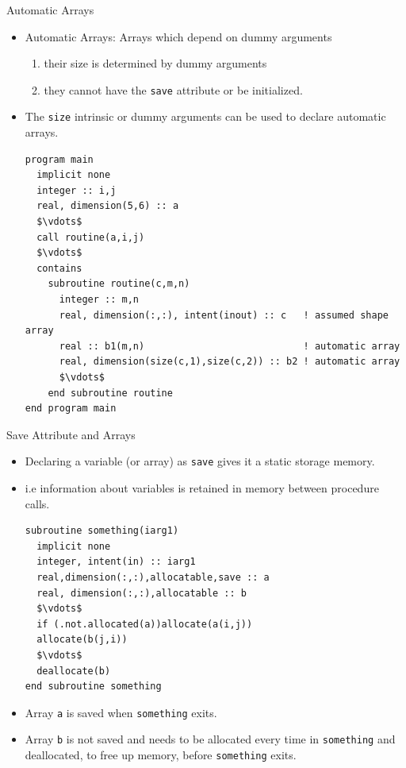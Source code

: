 \documentclass[c,mathserif,compress,xcolor=svgnames]{beamer}
\newcommand{\lstfortran}[1]{\lstinline[language={[90]Fortran},basicstyle=\footnotesize\ttfamily]|#1|}
\begin{document}
\begin{frame}[fragile]{Automatic Arrays}
  \begin{itemize}
    \item Automatic Arrays: Arrays which depend on dummy arguments
    \begin{enumerate}
      \scriptsize
      \item their size is determined by dummy arguments
      \item they cannot have the \lstfortran{save} attribute or be initialized.
    \end{enumerate}
    \item The \lstfortran{size} intrinsic or dummy arguments can be used to declare automatic arrays.
      \begin{lstlisting}[language={[90]Fortran},mathescape,basicstyle=\fontsize{6}{7}\selectfont\ttfamily]
program main
  implicit none
  integer :: i,j
  real, dimension(5,6) :: a
  $\vdots$
  call routine(a,i,j)
  $\vdots$
  contains
    subroutine routine(c,m,n)
      integer :: m,n
      real, dimension(:,:), intent(inout) :: c   ! assumed shape array
      real :: b1(m,n)                            ! automatic array
      real, dimension(size(c,1),size(c,2)) :: b2 ! automatic array
      $\vdots$
    end subroutine routine
end program main
      \end{lstlisting}
  \end{itemize}
\end{frame}

\begin{frame}[fragile]{Save Attribute and Arrays}
  \begin{itemize}
    \item Declaring a variable (or array) as \lstfortran{save} gives it a static storage memory.
    \item i.e information about variables is retained in memory between procedure calls.
      \begin{lstlisting}[language={[90]Fortran},mathescape,basicstyle=\fontsize{6}{7}\selectfont\ttfamily]
subroutine something(iarg1)
  implicit none
  integer, intent(in) :: iarg1 
  real,dimension(:,:),allocatable,save :: a 
  real, dimension(:,:),allocatable :: b 
  $\vdots$ 
  if (.not.allocated(a))allocate(a(i,j)) 
  allocate(b(j,i))
  $\vdots$
  deallocate(b)
end subroutine something
      \end{lstlisting}
    \item Array {\lstfortran{a}} is saved when {\lstfortran{something}} exits.
    \item Array {\lstfortran{b}} is not saved and needs to be allocated every time in {\lstfortran{something}}  and deallocated, to free up memory, before {\lstfortran{something}} exits.
  \end{itemize}
\end{frame}
\end{document}
